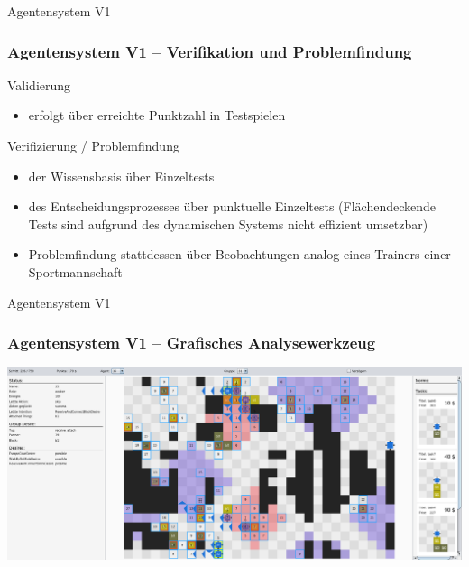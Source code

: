 \documentclass[aspectratio=169]{beamer} %
\begin{document}
\begin{frame}{Agentensystem V1}
\frametitle{Agentensystem V1 -- Verifikation und Problemfindung}
\begin{block}{Validierung}
\begin{itemize}
	\item erfolgt über erreichte Punktzahl in Testspielen
\end{itemize}
\end{block}
\begin{block}{Verifizierung / Problemfindung}
\begin{itemize}
	\item der Wissensbasis über Einzeltests
	\item des Entscheidungsprozesses über punktuelle Einzeltests (Flächendeckende Tests sind aufgrund des dynamischen Systems nicht effizient umsetzbar)
	\item Problemfindung stattdessen über Beobachtungen analog eines Trainers einer Sportmannschaft
\end{itemize}
\end{block}
\end{frame}

\begin{frame}{Agentensystem V1}
\frametitle{Agentensystem V1 -- Grafisches Analysewerkzeug}
\begin{center}
\includegraphics[width=\textwidth]{./figures/Debugger2.png} 
\end{center}
\end{frame}
\end{document}

